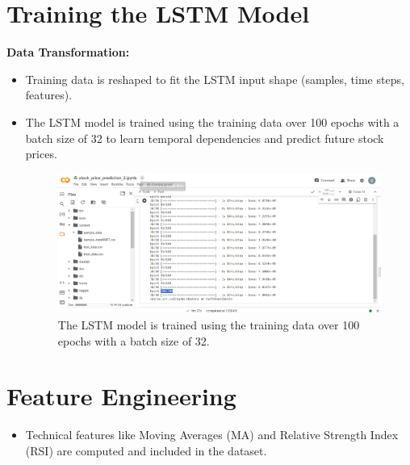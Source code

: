 \documentclass{article}
\begin{document}
\section{Training the LSTM Model}
{\bfseries Data Transformation: }
\begin{itemize}
  \item Training data is reshaped to fit the LSTM input shape (samples, time steps, features).

\end{itemize}

\begin{itemize}
  \item The LSTM model is trained using the training data over 100 epochs with a batch size of 32 to learn temporal dependencies and predict future stock prices.

  \begin{figure}
      \centering
      \includegraphics[width=1\linewidth]{Capture9.PNG}
      \caption{The LSTM model is trained using the training data over 100 epochs with a batch size of 32.}
      \label{fig:enter-label}
  \end{figure}
\end{itemize}
 
\section{Feature Engineering}
\begin{itemize}
  \item Technical features like Moving Averages (MA) and Relative Strength Index (RSI) are computed and included in the dataset.

\end{itemize}
\end{document}
